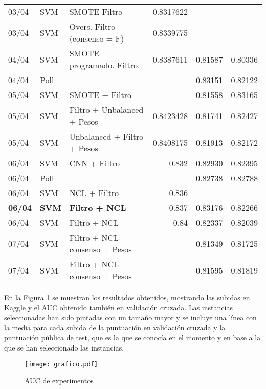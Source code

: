 \documentclass[11pt]{article}
\begin{document}
{\begin{center}
\begin{tabular}{lllrrr}
03/04 & SVM & SMOTE Filtro & 0.8317622 &  & \\
03/04 & SVM & Overs. Filtro (consenso = F) & 0.8339775 &  & \\
04/04 & SVM & SMOTE programado. Filtro. & 0.8387611 & 0.81587 & 0.80336\\
04/04 & Poll &  &  & 0.83151 & 0.82122\\
05/04 & SVM & SMOTE + Filtro &  & 0.81558 & 0.83165\\
05/04 & SVM & Filtro + Unbalanced + Pesos & 0.8423428 & 0.81741 & 0.82427\\
05/04 & SVM & Unbalanced + Filtro + Pesos & 0.8408175 & 0.81913 & 0.82172\\
06/04 & SVM & CNN + Filtro & 0.832 & 0.82930 & 0.82395\\
06/04 & Poll &  &  & 0.82738 & 0.82788\\
06/04 & SVM & NCL + Filtro & 0.836 &  & \\
\textbf{06/04} & \textbf{SVM} & \textbf{Filtro + NCL} & 0.837 & 0.83176 & 0.82266\\
06/04 & SVM & Filtro + NCL & 0.84 & 0.82337 & 0.82039\\
07/04 & SVM & Filtro + NCL consenso + Pesos &  & 0.81349 & 0.81725\\
07/04 & SVM & Filtro + NCL consenso + Pesos &  & 0.81595 & 0.81819\\
\end{tabular}
\end{center}
}

\newpage

En la Figura 1 se muestran los resultados obtenidos, mostrando las
subidas en Kaggle y el AUC obtenido también en validación cruzada. Las
instancias seleccionadas han sido pintadas con un tamaño mayor y se
incluye una línea con la media para cada subida de la puntuación en
validación cruzada y la puntuación pública de test, que es la que se
conocía en el momento y en base a la que se han seleccionado las
instancias.
\begin{figure}[htbp]
\centering
\texttt{[image: grafico.pdf]}
\caption{AUC de experimentos}
\end{figure}
\end{document}
